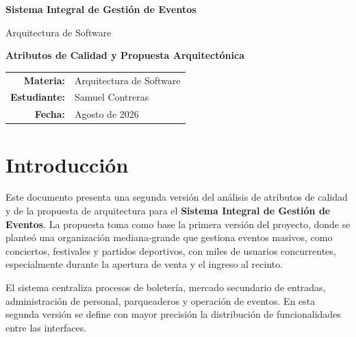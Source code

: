 \documentclass[12pt,a4paper]{article}
\begin{document}
\begin{titlepage}
\centering
\vspace*{2cm}
{\Huge\bfseries Sistema Integral de Gestión de Eventos\par}
\vspace{0.7cm}
{\Large Arquitectura de Software\par}
\vspace{1.2cm}
{\Large\bfseries Atributos de Calidad y Propuesta Arquitectónica\par}
\vspace{2cm}
\vfill
\begin{tabular}{rl}
\textbf{Materia:} & Arquitectura de Software\\
\textbf{Estudiante:} & Samuel Contreras\\
\textbf{Fecha:} & Agosto de 2026
\end{tabular}
\end{titlepage}

\tableofcontents
\newpage

\section{Introducción}

Este documento presenta una segunda versión del análisis de atributos de calidad y de la propuesta de arquitectura para el \textbf{Sistema Integral de Gestión de Eventos}. La propuesta toma como base la primera versión del proyecto, donde se planteó una organización mediana-grande que gestiona eventos masivos, como conciertos, festivales y partidos deportivos, con miles de usuarios concurrentes, especialmente durante la apertura de venta y el ingreso al recinto.

El sistema centraliza procesos de boletería, mercado secundario de entradas, administración de personal, parqueaderos y operación de eventos. En esta segunda versión se define con mayor precisión la distribución de funcionalidades entre las interfaces.
\end{document}
